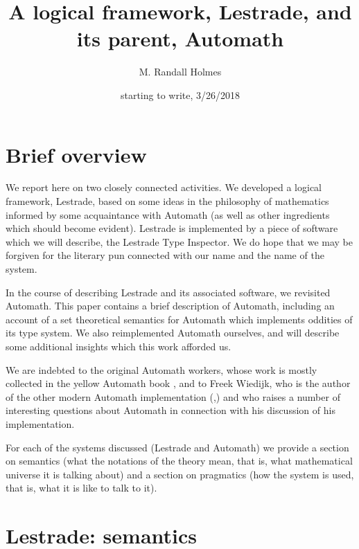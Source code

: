 \documentclass{article}
\title{A logical framework, Lestrade, and its parent, Automath}
\author{M. Randall Holmes}
\date{starting to write, 3/26/2018}
\begin{document}
\maketitle

\section{Brief overview}

We report here on two closely connected activities.  We developed a logical framework, Lestrade, based on some ideas in the philosophy of mathematics informed by some acquaintance with Automath (as well as other ingredients which should become evident).  Lestrade is implemented by a piece of software which we will describe, the Lestrade Type Inspector.  We do hope that we may be forgiven for the literary pun connected with our name and the name of the system.

In the course of describing Lestrade and its associated software, we revisited Automath.  This paper contains a brief description of Automath, including an account of a set theoretical semantics for Automath which implements oddities of its type system.  We also reimplemented Automath ourselves, and will describe some additional insights which this work afforded us.

We are indebted to the original Automath workers, whose work is mostly collected in the yellow Automath book \cite{yellowbook}, and to Freek Wiedijk, who is the  author of the other modern Automath implementation (\cite{autmanual},\cite{autpaper}) and who raises a number of interesting questions about Automath in connection with his discussion of his implementation.

For each of the systems discussed (Lestrade and Automath) we provide a section on semantics (what the notations of the theory mean, that is, what mathematical universe it is talking about) and a section on pragmatics (how the system is used, that is, what it is like to talk to it).

\newpage

\section{Lestrade:  semantics}
\end{document}
